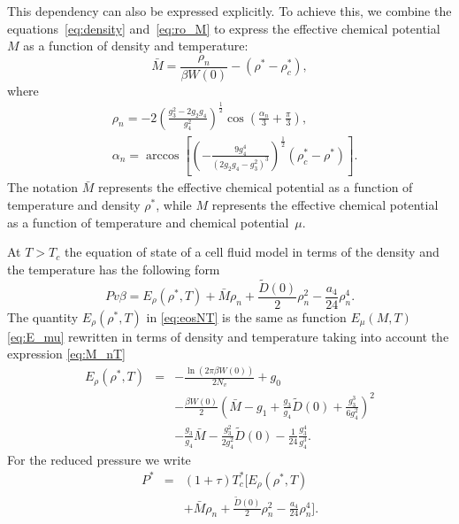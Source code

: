 This dependency can also be expressed explicitly. To achieve this, we combine the equations~\eqref{eq:density} and~\eqref{eq:ro_M} to express the effective chemical potential $M$ as a function of density and temperature:
\begin{equation}\label{eq:M_nT}
	\bar M = \frac{\rho_{n}}{\beta W(0)} - (\rho^* - \rho^*_c),
\end{equation}
where
\begin{align} \label{eq:ro_nT}
	& \rho_{n} = - 2 \left(\frac{g_3^2 - 2g_2 g_4}{g_4^2} \right)^{\frac{1}{2}} \cos \left( \frac{\alpha_n}{3} + \frac{\pi}{3} \right), \\
	& \alpha_n = \arccos \left[ \left( - \frac{9 g_4^4}{\left( 2 g_2 g_4 - g_3^2\right)^3}\right)^{\frac{1}{2}} (\rho^*_c - \rho^*)\right]. \nonumber 
\end{align}
The notation $\bar{M}$ represents the effective chemical potential as a function of temperature and density $\rho^*$, while $M$ represents the effective chemical potential as a function of temperature and chemical potential~$\mu$.

At $T>T_c$ the equation of state of a cell fluid model in terms of the density and the temperature has the following form
\begin{equation}\label{eq:eosNT}
	Pv\beta = E_\rho (\rho^*,T) + \bar M \rho_{n} + \frac{\tilde D(0)}{2} \rho_{n}^2 - \frac{a_4}{24} \rho_{n}^4.
\end{equation}
The quantity $E_\rho (\rho^*, T)$ in \eqref{eq:eosNT} is the same as function $E_\mu (M,T)$ \eqref{eq:E_mu} rewritten in terms of density and temperature taking into account the expression \eqref{eq:M_nT}
\begin{eqnarray}\label{eq:E_nu}
	E_\rho (\rho^*, T) & = & - \frac{\ln (2\pi \beta W(0))}{2 N_v}  +  g_0 
	\nonumber\\
	&& - \frac{\beta W(0)}{2} 
	\left(\bar{M} - g_1 + \frac{g_3}{g_4} \tilde{D}(0) + \frac{g_3^3}{6g_4^2} \right)^{2} 
	\nonumber\\
	&& - \frac{g_3}{g_4} {\bar{M}} - \frac{g_3^2}{2 g_4^2}  \tilde D(0) - \frac{1}{24} \frac{g_3^4}{g_4^3}. 
\end{eqnarray}
For the reduced pressure we write
\begin{eqnarray}
	\label{eq:eosPTn_reduced}
	P^* & = & (1 + \tau)T^*_c \bigg[ E_\rho (\rho^*,T) 
	\nonumber\\
	&& + \bar{M} \rho_{n} + \frac{\tilde D(0)}{2} \rho_{n}^2 - \frac{a_4}{24} \rho_{n}^4\bigg].
\end{eqnarray}

